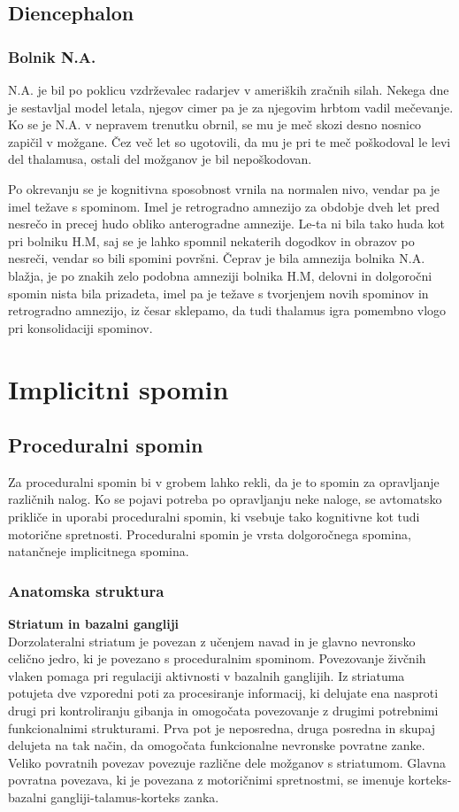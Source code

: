 \documentclass[10pt,a4paper]{article}
\begin{document}
\subsection{Diencephalon}
\subsubsection{Bolnik N.A.}
N.A. je bil po poklicu vzdrževalec radarjev v ameriških zračnih silah. Nekega dne je sestavljal model letala, njegov cimer pa je za njegovim hrbtom vadil mečevanje. Ko se je N.A. v nepravem trenutku obrnil, se mu je meč skozi desno nosnico zapičil v možgane. Čez več let so ugotovili, da mu je pri te meč poškodoval le levi del thalamusa, ostali del možganov je bil nepoškodovan.

Po okrevanju se je kognitivna sposobnost vrnila na normalen nivo, vendar pa je imel težave s spominom. Imel je retrogradno amnezijo za obdobje dveh let pred nesrečo in precej hudo obliko anterogradne amnezije. Le-ta ni bila tako huda kot pri bolniku H.M, saj se je lahko spomnil nekaterih dogodkov in obrazov po nesreči, vendar so bili spomini površni. Čeprav je bila amnezija bolnika N.A. blažja, je po znakih zelo podobna amneziji bolnika H.M, delovni in dolgoročni spomin nista bila prizadeta, imel pa je težave s tvorjenjem novih spominov in retrogradno amnezijo, iz česar sklepamo, da tudi thalamus igra pomembno vlogo pri konsolidaciji spominov.

\section{Implicitni spomin}
\subsection{Proceduralni spomin}
Za proceduralni spomin bi v grobem lahko rekli, da je to spomin za opravljanje različnih nalog. Ko se pojavi potreba po opravljanju neke naloge, se avtomatsko prikliče in uporabi proceduralni spomin, ki vsebuje tako kognitivne kot tudi motorične spretnosti. Proceduralni spomin je vrsta dolgoročnega spomina, natančneje implicitnega spomina.

\subsubsection{Anatomska struktura}
\textbf{Striatum in bazalni gangliji}\\
Dorzolateralni striatum je povezan z učenjem navad in je glavno nevronsko celično jedro, ki je povezano s proceduralnim spominom. Povezovanje živčnih vlaken pomaga pri regulaciji aktivnosti v bazalnih ganglijih. Iz striatuma potujeta dve vzporedni poti za procesiranje informacij, ki delujate ena nasproti drugi pri kontroliranju gibanja in omogočata povezovanje z drugimi potrebnimi funkcionalnimi strukturami. Prva pot je neposredna, druga posredna in skupaj delujeta na tak način, da omogočata funkcionalne nevronske povratne zanke. Veliko povratnih povezav povezuje različne dele možganov s striatumom. Glavna povratna povezava, ki je povezana z motoričnimi spretnostmi, se imenuje korteks-bazalni gangliji-talamus-korteks zanka.
\end{document}
